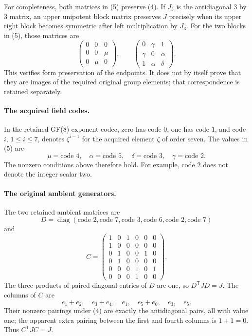 \documentclass[11pt]{article}
\begin{document}
For completeness, both matrices in (5) preserve (4).
If \(J_3\) is the antidiagonal \(3\) by \(3\) matrix, an upper
unipotent block matrix preserves \(J\) precisely when its upper
right block becomes symmetric after left multiplication by \(J_3\).
For the two blocks in (5), those matrices are
\[
 \begin{pmatrix}0&0&0\\0&0&\mu\\0&\mu&0\end{pmatrix},
 \qquad
 \begin{pmatrix}0&\gamma&1\\\gamma&0&\alpha\\1&\alpha&\delta\end{pmatrix}.
\]
This verifies form preservation of the endpoints. It does not
by itself prove that they are images of the required original
group elements; that correspondence is retained separately.

\paragraph{The acquired field codes.}
In the retained GF(8) exponent codec, zero has code \(0\), one has
code \(1\), and code \(i\), \(1\leq i\leq7\), denotes
\(\zeta^{i-1}\) for the acquired element \(\zeta\) of order seven.
The values in (5) are
\[
    \mu=\text{code }4,\quad \alpha=\text{code }5,\quad
    \delta=\text{code }3,\quad \gamma=\text{code }2.
\]
The nonzero conditions above therefore hold. For example,
code \(2\) does not denote the integer scalar two.

\paragraph{The original ambient generators.}
The two retained ambient matrices are
\[
 D=\operatorname{diag}(\text{code }2,\text{code }7,
       \text{code }3,\text{code }6,\text{code }2,\text{code }7)
\]
and
\[
 C=\begin{pmatrix}
 1&0&1&0&0&0\\
 1&0&0&0&0&0\\
 0&1&0&0&1&0\\
 0&1&0&0&0&0\\
 0&0&0&1&0&1\\
 0&0&0&1&0&0
 \end{pmatrix}.                                      \tag{6}
\]
The three products of paired diagonal entries of \(D\) are one,
so \(D^{\mathsf T}JD=J\).
The columns of \(C\) are
\[
 e_1+e_2,\quad e_3+e_4,\quad e_1,\quad
 e_5+e_6,\quad e_3,\quad e_5.
\]
Their nonzero pairings under (4) are exactly the antidiagonal
pairs, all with value one; the apparent extra pairing between
the first and fourth columns is \(1+1=0\).
Thus \(C^{\mathsf T}JC=J\).
\end{document}
